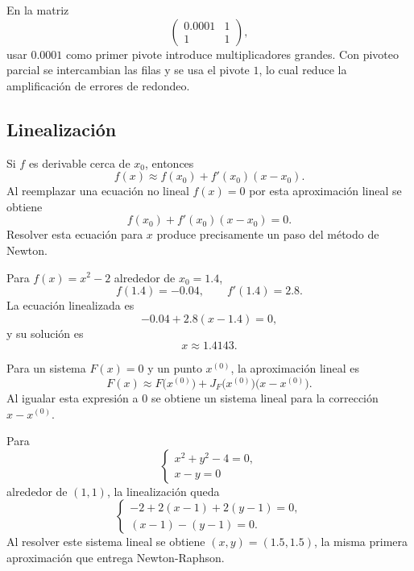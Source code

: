 \documentclass[a4,11pt]{aleph-notas}
\begin{document}
\begin{ejem}
    En la matriz
    \[
        \begin{pmatrix}
            0.0001 & 1\\
            1 & 1
        \end{pmatrix},
    \]
    usar $0.0001$ como primer pivote introduce multiplicadores grandes. Con pivoteo parcial se intercambian las filas y se usa el pivote $1$, lo cual reduce la amplificación de errores de redondeo.
\end{ejem}

\subsection{Linealización}

\begin{defi}
    Si $f$ es derivable cerca de $x_0$, entonces
    \[
        f(x)\approx f(x_0)+f'(x_0)(x-x_0).
    \]
    Al reemplazar una ecuación no lineal $f(x)=0$ por esta aproximación lineal se obtiene
    \[
        f(x_0)+f'(x_0)(x-x_0)=0.
    \]
    Resolver esta ecuación para $x$ produce precisamente un paso del método de Newton.
\end{defi}

\begin{ejem}
    Para $f(x)=x^2-2$ alrededor de $x_0=1.4$,
    \[
        f(1.4)=-0.04,
        \qquad
        f'(1.4)=2.8.
    \]
    La ecuación linealizada es
    \[
        -0.04+2.8(x-1.4)=0,
    \]
    y su solución es
    \[
        x\approx 1.4143.
    \]
\end{ejem}

\begin{defi}
    Para un sistema ${F}({x})={0}$ y un punto ${x}^{(0)}$, la aproximación lineal es
    \[
        {F}({x})
        \approx
        {F}\bigl({x}^{(0)}\bigr)
        +
        J_{{F}}\bigl({x}^{(0)}\bigr)
        \bigl({x}-{x}^{(0)}\bigr).
    \]
    Al igualar esta expresión a ${0}$ se obtiene un sistema lineal para la corrección ${x}-{x}^{(0)}$.
\end{defi}

\begin{ejem}
    Para
    \[
        \begin{cases}
            x^2+y^2-4=0,\\
            x-y=0
        \end{cases}
    \]
    alrededor de $(1,1)$, la linealización queda
    \[
        \begin{cases}
            -2+2(x-1)+2(y-1)=0,\\
            (x-1)-(y-1)=0.
        \end{cases}
    \]
    Al resolver este sistema lineal se obtiene $(x,y)=(1.5,1.5)$, la misma primera aproximación que entrega Newton-Raphson.
\end{ejem}
\end{document}
